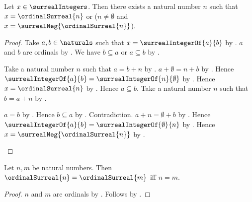 \begin{theorem}\label{surreal_integer_canonical_normal_form}
    Let $x\in\surrealIntegers$.
    Then there exists a natural number $n$ such that
        $x=\ordinalSurreal{n}$ or
        ($n\neq\emptyset$ and
        $x=\surrealNeg{\ordinalSurreal{n}}$).
\end{theorem}
\begin{proof}
    Take $a,b\in\naturals$ such that
        $x=\surrealIntegerOf{a}{b}$
        by .
    $a$ and $b$ are ordinals by .
    We have $b\subseteq a$ or $a\subseteq b$
        by .
    \begin{byCase}
            Take a natural number $n$ such that $a=b+n$
                by .
            $a+\emptyset=n+b$
                by .
            Hence $\surrealIntegerOf{a}{b}
                =\surrealIntegerOf{n}{\emptyset}$
                by .
            Hence $x=\ordinalSurreal{n}$
                by .
            Hence $a\subseteq b$.
            Take a natural number $n$ such that $b=a+n$
                by .
            \begin{byCase}
                    $a=b$ by .
                    Hence $b\subseteq a$ by .
                    Contradiction.
                    $a+n=\emptyset+b$
                        by .
                    Hence $\surrealIntegerOf{a}{b}
                        =\surrealIntegerOf{\emptyset}{n}$
                        by .
                    Hence $x=\surrealNeg{\ordinalSurreal{n}}$
                        by .
            \end{byCase}
    \end{byCase}
\end{proof}

\begin{theorem}\label{surreal_integer_positive_normal_form_injective}
    Let $n,m$ be natural numbers.
    Then $\ordinalSurreal{n}=\ordinalSurreal{m}$ iff $n=m$.
\end{theorem}
\begin{proof}
    $n$ and $m$ are ordinals by .
    Follows by .
\end{proof}

